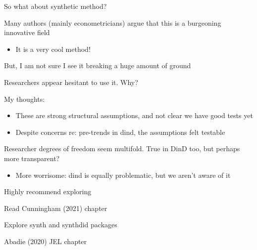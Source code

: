 \documentclass[notes,11pt, aspectratio=169]{beamer}
\newenvironment{wideitemize}{\itemize\addtolength{\itemsep}{10pt}}{\enditemize}
\begin{document}
\begin{frame}{So what about synthetic method?}
  \begin{wideitemize}
  \item Many authors (mainly econometricians) argue that this is a burgeoning innovative field
    \begin{itemize}
    \item It is a very cool method!
    \end{itemize}
  \item But, I am not sure I see it breaking a huge amount of ground
  \item Researchers appear hesitant to use it. Why?
  \item  My thoughts:
    \begin{itemize}
    \item These are strong structural assumptions, and not clear we
      have good tests yet
    \item Despite concerns re: pre-trends in dind, the assumptions
      felt testable
    \end{itemize}
  \item Researcher degrees of freedom seem multifold. True in DinD
    too, but perhaps more transparent?
    \begin{itemize}
    \item More worrisome: dind is equally problematic, but we aren't
      aware of it
    \end{itemize}
  \end{wideitemize}
\end{frame}

\begin{frame}{Highly recommend exploring}
  \begin{wideitemize}
  \item Read Cunningham (2021) chapter
  \item Explore synth and synthdid packages
  \item Abadie (2020) JEL chapter
  \end{wideitemize}
\end{frame}
\end{document}

